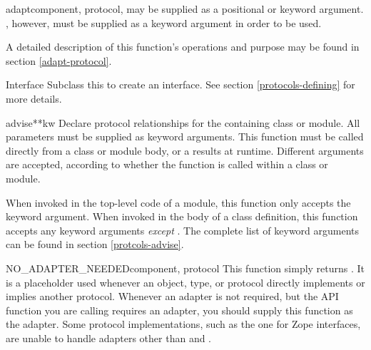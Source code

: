 \begin{verbatim%
}
\begin{verbatim%
}
\begin{verbatim%
}
\begin{verbatim%
}
\begin{funcdesc}{adapt}{component, protocol,
}
 may be supplied as a positional or keyword argument.
, however, must be supplied as a keyword argument in order
to be used.

A detailed description of this function's operations and purpose may be found in
section \ref{adapt-protocol}.
\end{funcdesc}

\begin{classdesc*}{Interface}
Subclass this to create an interface.  See section \ref{protocols-defining}
for more details.
\end{classdesc*}












\begin{funcdesc}{advise}{**kw}
Declare protocol relationships for the containing class or module.  All
parameters must be supplied as keyword arguments.  This function must be
called directly from a class or module body, or a 
results at runtime.  Different arguments are accepted, according to whether
the function is called within a class or module.

When invoked in the top-level code of a module, this function only accepts
the  keyword argument.  When invoked in the body of a
class definition, this function accepts any keyword arguments \emph{except}
.  The complete list of keyword arguments can be found
in section \ref{protcols-advise}.

\end{funcdesc}


\begin{funcdesc}{NO_ADAPTER_NEEDED}{component, protocol}
This function simply returns .  It is a placeholder used whenever
an object, type, or protocol directly implements or implies another protocol.
Whenever an adapter is not required, but the  API function
you are calling requires an adapter, you should supply this function as the
adapter.  Some protocol implementations, such as the one for Zope interfaces,
are unable to handle adapters other than  and
.
\end{funcdesc}



\end{verbatim%
}
\end{verbatim%
}
\end{verbatim%
}
\end{verbatim%
}
